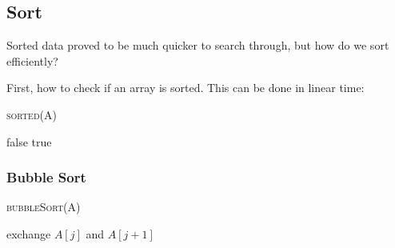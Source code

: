 \newpage
\subsection{Sort}
Sorted data proved to be much quicker to search through, but how do we sort efficiently?

First, how to check if an array is sorted. This can be done in linear time:
\begin{algorithm}
    \begin{spacing}{1.2}
        \caption{\textsc{sorted(A)}}
        \begin{algorithmic}[1]
                 \Return false 
                \EndIf
            \EndFor
            \State \Return true
        \end{algorithmic}
    \end{spacing}
\end{algorithm}



\subsubsection{Bubble Sort}
\begin{algorithm}
    \begin{spacing}{1.2}
        \caption{\textsc{bubbleSort(A)}}
        \begin{algorithmic}[1]
                        \State exchange $A[j]$ and $A[j + 1]$ 
                    \EndIf
                \EndFor
            \EndFor
        \end{algorithmic}
    \end{spacing}
\end{algorithm}




